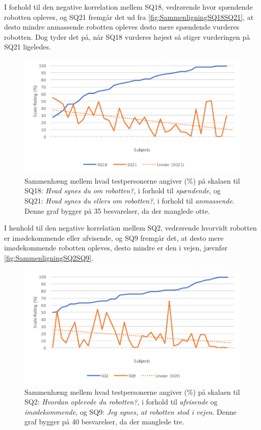 \noindent
%
I forhold til den negative korrelation mellem SQ18, vedrørende hvor spændende robotten opleves, og SQ21 fremgår det ud fra \autoref{fig:SammenligningSQ18SQ21}, at desto mindre anmassende robotten opleves desto mere spændende vurderes robotten. Dog tyder det på, når SQ18 vurderes højest så stiger vurderingen på SQ21 ligeledes. 
%
\begin{figure}[H]
	\centering
	\includegraphics[width=\textwidth]{Figure/Korrelationsgrafer/SQ18+SQ21}
	\caption{Sammenhæng mellem hvad testpersonerne angiver (\%) på skalaen til SQ18: \textit{Hvad synes du om robotten?}, i forhold til \textit{spændende}, og SQ21: \textit{Hvad synes du ellers om robotten?}, i forhold til \textit{anmassende}. Denne graf bygger på 35 besvarelser, da der manglede otte.}
	\label{fig:SammenligningSQ18SQ21}
\end{figure}
\noindent
%
I henhold til den negative korrelation mellem SQ2, vedrørende hvorvidt robotten er imødekommende eller afvisende, og SQ9 fremgår det, at desto mere imødekommende robotten opleves, desto mindre er den i vejen, jævnfør \autoref{fig:SammenligningSQ2SQ9}.
%
\begin{figure}[H]
	\centering
	\includegraphics[width=\textwidth]{Figure/Korrelationsgrafer/SQ2+SQ9}
	\caption{Sammenhæng mellem hvad testpersonerne angiver (\%) på skalaen til SQ2: \textit{Hvordan oplevede du robotten?}, i forhold til \textit{afvisende} og \textit{imødekommende}, og SQ9: \textit{Jeg synes, at robotten stod i vejen}. Denne graf bygger på 40 besvarelser, da der manglede tre.}
	\label{fig:SammenligningSQ2SQ9}
\end{figure}
